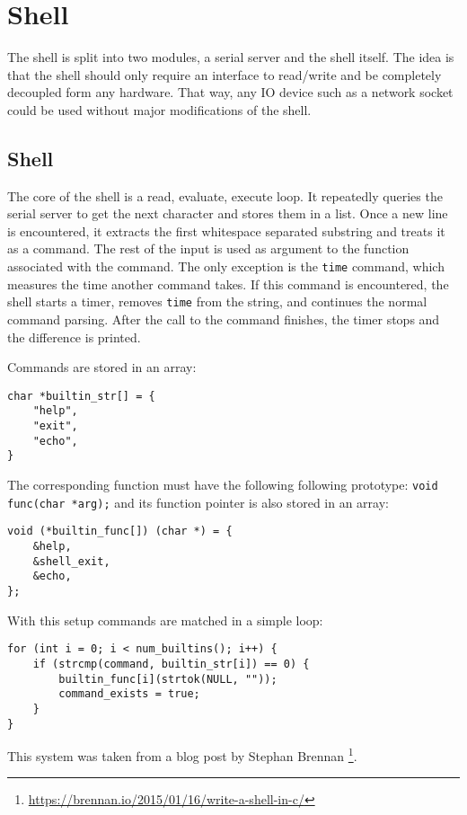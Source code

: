 \section{Shell}

The shell is split into two modules, a serial server and the shell itself.
The idea is that the shell should only require an interface to read/write and be completely decoupled form any hardware.
That way, any IO device such as a network socket could be used without major modifications of the shell.

\subsection{Shell}
The core of the shell is a read, evaluate, execute loop.
It repeatedly queries the serial server to get the next character and stores them in a list.
Once a new line is encountered, it extracts the first whitespace separated substring and treats it as a command.
The rest of the input is used as argument to the function associated with the command.
The only exception is the \verb|time| command, which measures the time another command takes.
If this command is encountered, the shell starts a timer, removes \verb|time| from the string, and continues the normal command parsing.
After the call to the command finishes, the timer stops and the difference is printed.

Commands are stored in an array:
\begin{lstlisting}
char *builtin_str[] = {
    "help",
    "exit",
    "echo",
}
\end{lstlisting}

The corresponding function must have the following following prototype: \verb|void func(char *arg);| and its function pointer
is also stored in an array:

\begin{lstlisting}
void (*builtin_func[]) (char *) = {
    &help,
    &shell_exit,
    &echo,
};
\end{lstlisting}

With this setup commands are matched in a simple loop:

\begin{lstlisting}
for (int i = 0; i < num_builtins(); i++) {
    if (strcmp(command, builtin_str[i]) == 0) {
        builtin_func[i](strtok(NULL, ""));
        command_exists = true;
    }
}
\end{lstlisting}

This system was taken from a blog post by Stephan Brennan \footnote{\url{https://brennan.io/2015/01/16/write-a-shell-in-c/}}.

